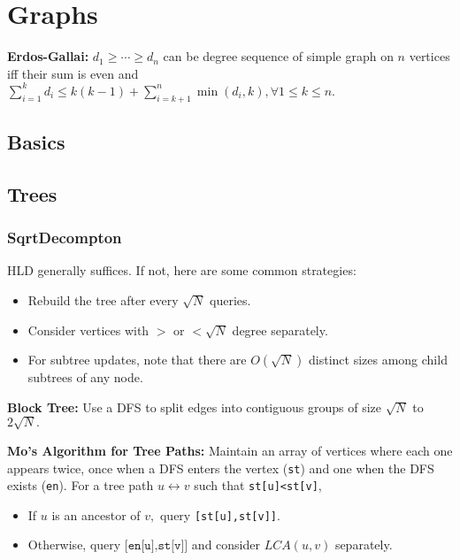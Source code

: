 \chapter{Graphs}

\textbf{Erdos-Gallai:} $d_1\geq\cdots\geq d_n$ can be degree sequence of simple graph on $n$ vertices iff their sum is even and $\sum_{i=1}^{k}d_{i}\leq k(k-1)+\sum _{i=k+1}^{n}\min(d_{i},k), \forall 1\le k\le n.$

\section{Basics}

\section{Trees}

	\subsection{SqrtDecompton}

		HLD generally suffices. If not, here are some common strategies:
		
		\begin{itemize}
			\item Rebuild the tree after every $\sqrt N$ queries. %
			\item Consider vertices with $>$ or $<\sqrt N$ degree separately. %
			\item For subtree updates, note that there are $O(\sqrt N)$ distinct sizes among child subtrees of any node.
		\end{itemize}

		\textbf{Block Tree:} Use a DFS to split edges into contiguous groups of size $\sqrt N$ to $2\sqrt N.$

		\textbf{Mo's Algorithm for Tree Paths:} Maintain an array of vertices where each one appears twice, once when a DFS enters the vertex (\texttt{st}) and one when the DFS exists (\texttt{en}). For a tree path $u\leftrightarrow v$ such that \texttt{st[u]<st[v]},

		\begin{itemize}
		\item If $u$ is an ancestor of $v,$ query \texttt{[st[u],st[v]]}.
		\item Otherwise, query $\texttt{[en[u],st[v]]}$ and consider $LCA(u,v)$ separately.
		\end{itemize}

